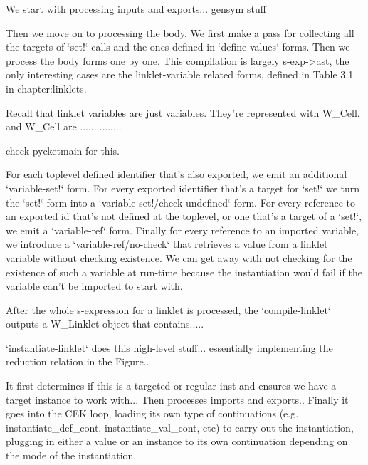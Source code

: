 		\begin{paragraph-here}%
			We start with processing inputs and exports... gensym stuff
		\end{paragraph-here}

		\begin{paragraph-here}%
			Then we move on to processing the body. We first make a pass for collecting all the targets of `set!` calls and the ones defined in `define-values` forms. Then we process the body forms one by one. This compilation is largely s-exp->ast, the only interesting cases are the linklet-variable related forms, defined in Table 3.1 in chapter:linklets.
		\end{paragraph-here}

		\begin{paragraph-here}%
			Recall that linklet variables are just variables. They're represented with W\_Cell. and W\_Cell are ...............

				check pycketmain for this.
		\end{paragraph-here}

		\begin{paragraph-here}%
			For each toplevel defined identifier that's also exported, we emit an additional `variable-set!` form. For every exported identifier that's a target for `set!` we turn the `set!` form into a `variable-set!/check-undefined` form. For every reference to an exported id that's not defined at the toplevel, or one that's a target of a `set!`, we emit a `variable-ref` form. Finally for every reference to an imported variable, we introduce a `variable-ref/no-check` that retrieves a value from a linklet variable without checking existence. We can get away with not checking for the existence of such a variable at run-time because the instantiation would fail if the variable can't be imported to start with.
		\end{paragraph-here}

		\begin{paragraph-here}%
			After the whole s-expression for a linklet is processed, the `compile-linklet` outputs a W\_Linklet object that contains.....
		\end{paragraph-here}

		\begin{paragraph-here}%
			`instantiate-linklet` does this high-level stuff... essentially implementing the reduction relation in the Figure..
		\end{paragraph-here}

		\begin{paragraph-here}%
			It first determines if this is a targeted or regular inst and ensures we have a target instance to work with... Then processes imports and exports.. Finally it goes into the CEK loop, loading its own type of continuations (e.g. instantiate\_def\_cont, instantiate\_val\_cont, etc) to carry out the instantiation, plugging in either a value or an instance to its own continuation depending on the mode of the instantiation.
		\end{paragraph-here}

